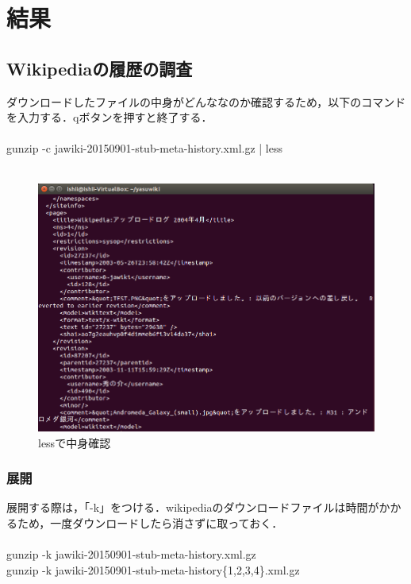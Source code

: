 \chapter{結果}



\section{Wikipediaの履歴の調査}



ダウンロードしたファイルの中身がどんななのか確認するため，以下のコマンドを入力する．qボタンを押すと終了する．
\\
\\
gunzip -c jawiki-20150901-stub-meta-history.xml.gz | less
\\
\\
\begin{figure}[H]
\centering
\includegraphics[width=14cm]{jawiki_contents.png}
\caption{lessで中身確認}\label{サンプル図}
\end{figure}


\subsection{展開}

展開する際は，「-k」をつける．wikipediaのダウンロードファイルは時間がかかるため，一度ダウンロードしたら消さずに取っておく．
\\
\\
gunzip -k jawiki-20150901-stub-meta-history.xml.gz
\\
gunzip -k jawiki-20150901-stub-meta-history\{1,2,3,4\}.xml.gz
\\
\\







